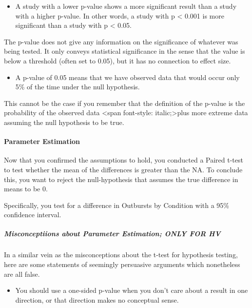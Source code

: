 \documentclass[
]{article}
\providecommand{\tightlist}{%
  \setlength{\itemsep}{0pt}\setlength{\parskip}{0pt}}
\begin{document}
\begin{itemize}
\tightlist
\item
  A study with a lower p-value shows a more significant result than a
  study with a higher p-value. In other words, a study with p
  \textless{} 0.001 is more significant than a study with p \textless{}
  0.05.
\end{itemize}

The p-value does not give any information on the significance of
whatever was being tested. It only conveys statistical significance in
the sense that the value is below a threshold (often set to 0.05), but
it has no connection to effect size.

\begin{itemize}
\tightlist
\item
  A p-value of 0.05 means that we have observed data that would occur
  only 5\% of the time under the null hypothesis.
\end{itemize}

This cannot be the case if you remember that the definition of the
p-value is the probability of the observed data \textless span
font-style: italic;\textgreater plus more extreme data assuming the null
hypothesis to be true.

\hypertarget{parameter-estimation}{%
\paragraph{Parameter Estimation}\label{parameter-estimation}}

Now that you confirmed the assumptions to hold, you conducted a Paired
t-test to test whether the mean of the differences is greater than the
NA. To conclude this, you want to reject the null-hypothesis that
assumes the true difference in means to be 0.

Specifically, you test for a difference in Outbursts by Condition with a
95\% confidence interval.

\hypertarget{misconceptiions-about-parameter-estimation-only-for-hv}{%
\subparagraph{Misconceptiions about Parameter Estimation; ONLY FOR
HV}\label{misconceptiions-about-parameter-estimation-only-for-hv}}

In a similar vein as the misconceptions about the t-test for hypothesis
testing, here are some statements of seemingly persuasive arguments
which nonetheless are all false.

\begin{itemize}
\tightlist
\item
  You should use a one-sided p-value when you don't care about a result
  in one direction, or that direction makes no conceptual sense.
\end{itemize}
\end{document}
